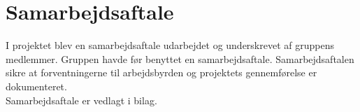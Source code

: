 \section{Samarbejdsaftale}
I projektet blev en samarbejdsaftale udarbejdet og underskrevet af gruppens medlemmer. 
Gruppen havde før benyttet en samarbejdsaftale. Samarbejdsaftalen sikre at forventningerne til arbejdsbyrden og projektets gennemførelse er dokumenteret. \\
Samarbejdsaftale er vedlagt i bilag. 

\clearpage
